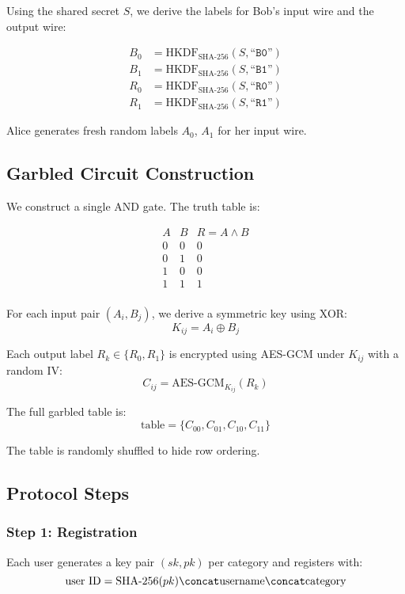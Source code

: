 \documentclass[12pt]{article}
\begin{document}
Using the shared secret $S$, we derive the labels for Bob's input wire and the output wire:

\[
\begin{aligned}
B_0 &= \text{HKDF}_{\text{SHA-256}}(S, \texttt{``B0''}) \\
B_1 &= \text{HKDF}_{\text{SHA-256}}(S, \texttt{``B1''}) \\
R_0 &= \text{HKDF}_{\text{SHA-256}}(S, \texttt{``R0''}) \\
R_1 &= \text{HKDF}_{\text{SHA-256}}(S, \texttt{``R1''})
\end{aligned}
\]

Alice generates fresh random labels $A_0$, $A_1$ for her input wire.

\subsection*{Garbled Circuit Construction}

We construct a single AND gate. The truth table is:

\[
\begin{array}{ccc}
A & B & R = A \land B \\
\hline
0 & 0 & 0 \\
0 & 1 & 0 \\
1 & 0 & 0 \\
1 & 1 & 1 \\
\end{array}
\]

For each input pair $(A_i, B_j)$, we derive a symmetric key using XOR:
\[
K_{ij} = A_i \oplus B_j
\]

Each output label $R_k \in \{R_0, R_1\}$ is encrypted using AES-GCM under $K_{ij}$ with a random IV:
\[
C_{ij} = \text{AES-GCM}_{K_{ij}}(R_k)
\]

The full garbled table is:
\[
\text{table} = \{ C_{00}, C_{01}, C_{10}, C_{11} \}
\]

The table is randomly shuffled to hide row ordering.

\subsection*{Protocol Steps}

\subsubsection*{Step 1: Registration}

Each user generates a key pair $(sk, pk)$ per category and registers with:
\[
\text{user ID} = \text{SHA-256}(pk) \concat \text{username} \concat \text{category}
\]
\end{document}
